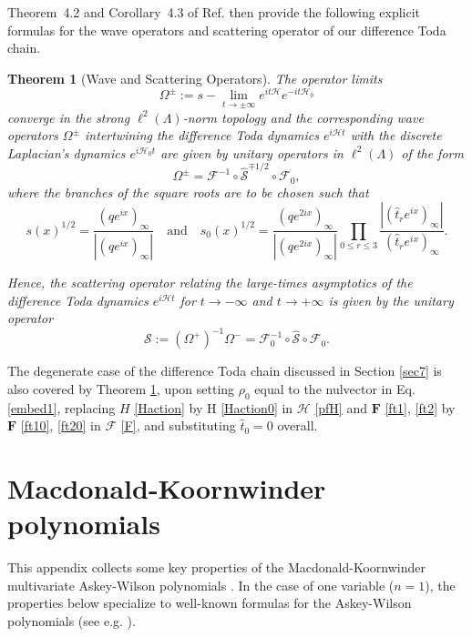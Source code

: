 \documentclass[reqno]{amsart}
\newtheorem{theorem}{Theorem}
\theoremstyle{remark}
\numberwithin{equation}{section}
\begin{document}
Theorem~4.2 and Corollary~4.3 of
Ref. \cite{die:scattering} then provide the following explicit formulas for the wave operators and scattering operator of our difference Toda chain.
\begin{theorem}[Wave and Scattering Operators]\label{scattering:thm}
  The operator limits
\begin{equation*}
\Omega^{\pm} :=s-\lim_{t\to \pm \infty}  e^{i t  \mathcal{H}}e^{-it \mathcal{H}_{0}}
\end{equation*}
converge in the strong $\ell^2(\Lambda)$-norm topology and the corresponding wave operators $\Omega^\pm$ intertwining the difference Toda
 dynamics $e^{i\mathcal{H}t}$  with the discrete Laplacian's dynamics $e^{i\mathcal{H}_0t}$
are given by unitary operators in $\ell^2(\Lambda )$ of the form
\begin{equation*}
\Omega^\pm = \boldsymbol{\mathcal{F}}^{-1} \circ \hat{\mathcal S}^{\mp 1/2}  \circ \boldsymbol{\mathcal{F}}_0,
\end{equation*}
where the branches of the square roots are to be chosen such that
\begin{equation*}
s(x)^{1/2}=\frac{(qe^{ix})_\infty }{|(qe^{ix})_\infty | }
\quad\text{and}\quad
 s_0(x)^{1/2}=\frac{(qe^{2ix})_\infty }{|(qe^{2ix})_\infty | }\prod_{0\leq r\leq 3}\frac{|(\hat{t}_re^{ix})_\infty |}{(\hat{t}_re^{ix})_\infty }  .
 \end{equation*}

Hence, the scattering operator relating the large-times asymptotics of the
difference Toda
 dynamics $e^{i\mathcal{H}t}$  for $t\to - \infty$ and $t\to +\infty$ is given by the unitary operator
\begin{equation*}
\mathcal{S}:=(\Omega^+)^{-1} \Omega^- =  \boldsymbol{\mathcal{F}}_0^{-1}  \circ \hat{\mathcal S} \circ  \boldsymbol{\mathcal{F}}_0 .
\end{equation*}
\end{theorem}
 The  degenerate case of  the difference Toda chain discussed in Section \ref{sec7} is also covered by Theorem \ref{scattering:thm}, upon setting
$\rho_0$ equal to the nulvector in Eq. \eqref{embed1},
 replacing $H$ \eqref{Haction} by $\text{H}$ \eqref{Haction0} in $\mathcal{H}$ \eqref{pfH} 
 and $\boldsymbol{F}$ \eqref{ft1}, \eqref{ft2} by $\mathbf{F}$ \eqref{ft10}, \eqref{ft20} in $\boldsymbol{\mathcal{F}}$ \eqref{F}, and
 substituting  $\hat{t}_0=0$ overall.

\appendix

\section{Macdonald-Koornwinder polynomials}\label{appA}
This appendix collects some key properties of the Macdonald-Koornwinder multivariate Askey-Wilson polynomials \cite{koo:askey-wilson,die:properties,mac:affine}. In the case of one variable ($n=1$), the properties below specialize to well-known formulas for the
Askey-Wilson polynomials (see e.g. \cite{koe-les-swa:hypergeometric}).
\end{document}
